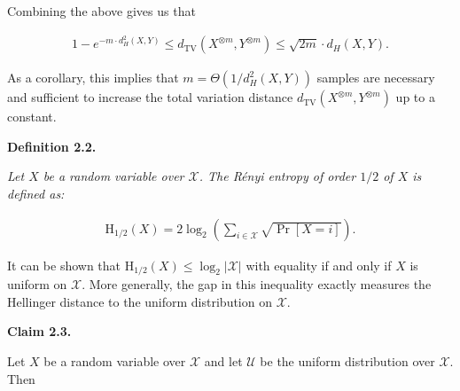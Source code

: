 \documentclass[10pt,a4paper]{article}
\begin{document}



Combining the above gives us that\par


\[\begin{gathered}
1-e^{-m\cdot d_{H}^{2}(X,Y)}\leq d_{\mathrm{TV}}(X^{\otimes m},Y^{\otimes m})\leq\sqrt{2m}\cdot d_{H}(X,Y).
\end{gathered}\]




As a corollary, this implies that $m=\Theta(1/d_{H}^{2}(X,Y))$ samples are necessary and sufficient to increase the total variation distance $d_{\mathrm{TV}}(X^{\otimes m},Y^{\otimes m})$ up to a constant.\par





\par\medskip\noindent\textbf{
\textbf{Definition 2.2}\textbf{.}
}\par



\emph{Let $X$ be a random variable over $\mathcal{X}$. The Rényi entropy of order $1/2$ of $X$ is defined as:}\par


\[\begin{gathered}
\mathrm{H}_{1/2}(X)=2\log_{2}\left(\sum_{i\in\mathcal{X}}\sqrt{\Pr[X=i]}\right).
\end{gathered}\]






It can be shown that $\mathrm{H}_{1/2}(X)\leq\log_{2}|\mathcal{X}|$ with equality if and only if $X$ is uniform on $\mathcal{X}$. More generally, the gap in this inequality exactly measures the Hellinger distance to the uniform distribution on $\mathcal{X}$.\par





\par\medskip\noindent\textbf{
Claim 2.3. 
}\par



Let $X$ be a random variable over $\mathcal{X}$ and let $\mathcal{U}$ be the uniform distribution over $\mathcal{X}$. Then\par
\end{document}
